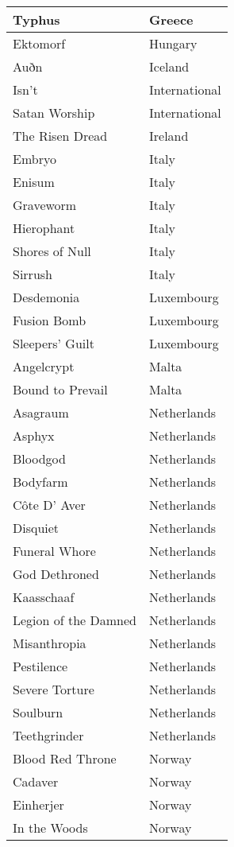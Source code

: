 \documentclass[12pt, a4paper, twoside]{report}
\begin{document}
\begin{center}
\begin{longtable}{|p{5cm}|p{5cm}|}
Typhus & Greece \\ \hline
Ektomorf & Hungary \\ \hline
Auðn & Iceland \\ \hline
Isn't & International \\ \hline
Satan Worship & International \\ \hline
The Risen Dread & Ireland \\ \hline
Embryo & Italy \\ \hline
Enisum & Italy \\ \hline
Graveworm & Italy \\ \hline
Hierophant & Italy \\ \hline
Shores of Null & Italy \\ \hline
Sirrush & Italy \\ \hline
Desdemonia & Luxembourg \\ \hline
Fusion Bomb & Luxembourg \\ \hline
Sleepers' Guilt & Luxembourg \\ \hline
Angelcrypt & Malta \\ \hline
Bound to Prevail & Malta \\ \hline
Asagraum & Netherlands \\ \hline
Asphyx & Netherlands \\ \hline
Bloodgod & Netherlands \\ \hline
Bodyfarm & Netherlands \\ \hline
Côte D' Aver & Netherlands \\ \hline
Disquiet & Netherlands \\ \hline
Funeral Whore & Netherlands \\ \hline
God Dethroned & Netherlands \\ \hline
Kaasschaaf & Netherlands \\ \hline
Legion of the Damned & Netherlands \\ \hline
Misanthropia & Netherlands \\ \hline
Pestilence & Netherlands \\ \hline
Severe Torture & Netherlands \\ \hline
Soulburn & Netherlands \\ \hline
Teethgrinder & Netherlands \\ \hline
Blood Red Throne & Norway \\ \hline
Cadaver & Norway \\ \hline
Einherjer & Norway \\ \hline
In the Woods & Norway \\ \hline

\end{longtable}
\end{center}
\end{document}
